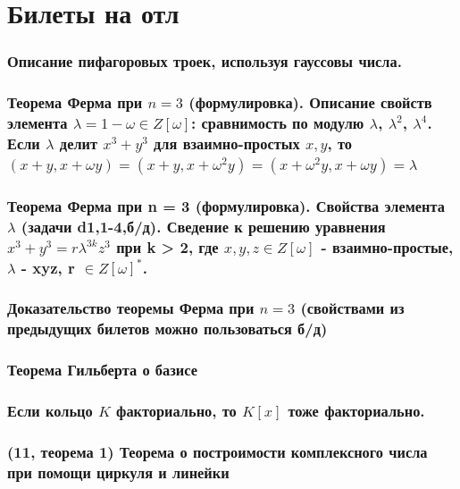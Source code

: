 \part{Билеты на отл}
\setcounter{section}{0}

\section{Описание пифагоровых троек, используя гауссовы числа.}


\section{Теорема Ферма при $n = 3$ (формулировка). Описание свойств элемента $\lambda = 1 - \omega \in Z[\omega]$: сравнимость по модулю $\lambda$, $\lambda^2$, $\lambda^4$. Если $\lambda$ делит $x^3 + y^3$ для взаимно-простых $x, y$, то $(x + y, x + \omega y) = (x + y, x + \omega^2 y) = (x + \omega^2y, x + \omega y) = \lambda$}


\section{Теорема Ферма при n = 3 (формулировка). Свойства элемента $\lambda$ (задачи d1,1-4,б/д). Сведение к решению уравнения $x^3 +y^3 = r\lambda^{3k}z^3$ при k > 2, где $x, y, z \in Z[\omega]$ - взаимно-простые, $\lambda$ - xyz, r $\in Z[\omega]^{*}$.}

\newpage{}

\section{Доказательство теоремы Ферма при $n = 3$ (свойствами из предыдущих билетов можно
пользоваться б/д)}


\section{Теорема Гильберта о базисе}

\newpage{}

\section{Если кольцо $K$ факториально, то $K[x]$ тоже факториально.}

\newpage{}

\section{(11, теорема 1) Теорема о построимости комплексного числа при помощи циркуля и линейки}

\newpage{}

